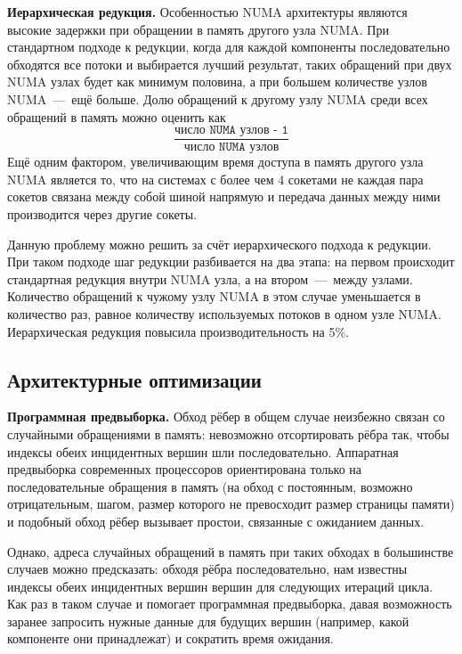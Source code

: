 \documentclass[a4paper,12pt]{extarticle}
\begin{document}
\textbf{Иерархическая редукция.}
Особенностью NUMA архитектуры являются высокие задержки при обращении в память другого узла NUMA.
При стандартном подходе к редукции, когда для каждой компоненты последовательно обходятся все потоки и выбирается лучший результат, таких обращений при двух NUMA узлах будет как минимум половина, а при большем количестве узлов NUMA~---~ещё больше. 
Долю обращений к другому узлу NUMA среди всех обращений в память можно оценить как
$$ \frac{\texttt{число NUMA узлов - 1}}{\texttt{число NUMA узлов}}$$
Ещё одним фактором, увеличивающим время доступа в память другого узла NUMA является то, что на системах с более чем 4 сокетами не каждая пара сокетов связана между собой шиной напрямую и передача данных между ними производится через другие сокеты.

Данную проблему можно решить за счёт иерархического подхода к редукции. При таком подходе шаг редукции разбивается на два этапа: на первом происходит стандартная редукция внутри NUMA узла, а на втором~---~между узлами. Количество обращений к чужому узлу NUMA в этом случае уменьшается в количество раз, равное количеству используемых потоков в одном узле NUMA. Иерархическая редукция повысила производительность на 5\%.


\subsection{Архитектурные оптимизации}
\label{subsec:optArch}

\textbf{Программная предвыборка.}
Обход рёбер в общем случае неизбежно связан со случайными обращениями в память: невозможно отсортировать рёбра так, чтобы индексы обеих инцидентных вершин шли последовательно.
Аппаратная предвыборка современных процессоров ориентирована только на последовательные обращения в память (на обход с постоянным, возможно отрицательным, шагом, размер которого не превосходит размер страницы памяти) и подобный обход рёбер вызывает простои, связанные с ожиданием данных.

Однако, адреса случайных обращений в память при таких обходах в большинстве случаев можно предсказать: обходя рёбра последовательно, нам известны индексы обеих инцидентных вершин вершин для следующих итераций цикла.
Как раз в таком случае и помогает программная предвыборка, давая возможность заранее запросить нужные данные для будущих вершин (например, какой компоненте они принадлежат) и сократить время ожидания.
\end{document}
